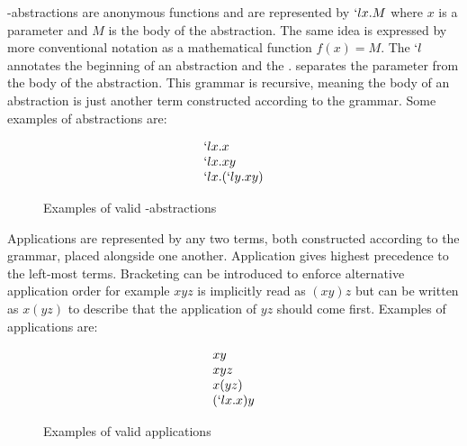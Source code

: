   \begin{figure}[!h]
  \end{figure}

  \lam-abstractions are anonymous functions and are represented by $`lx.M$ where $x$ is a parameter and $M$ is the body of the abstraction. 
  The same idea is expressed by more conventional notation as a mathematical function $f(x) = M$. 
  The $`l$ annotates the beginning of an abstraction and the $.$ separates the parameter from the body of the abstraction.
  This grammar is recursive, meaning the body of an abstraction is just another term constructed according to the grammar. 
  Some examples of abstractions are:
  
  \begin{figure}[!h]
    \[
      \begin{array}{l}
      `lx.x \\
      `lx.xy \\
      `lx.(`ly.xy)
      \end{array}
    \]
  \caption{Examples of valid \lam-abstractions}
  \end{figure}
  
  Applications are represented by any two terms, 
    both constructed according to the grammar, 
  placed alongside one another. 
  Application gives highest precedence to the left-most terms. 
  Bracketing can be introduced to enforce 
  alternative application order for example $xyz$ is implicitly read as 
    $(xy)z$ 
  but can be written as 
    $x(yz)$ 
  to describe that the application of $yz$ should come first. 
  Examples of applications are:
    \begin{figure}[!h]
      \[
        \begin{array}{l}
        xy \\
        xyz \\
        x(yz) \\
        (`lx.x)y
        \end{array}
      \]
    \caption{Examples of valid applications}
    \end{figure}

